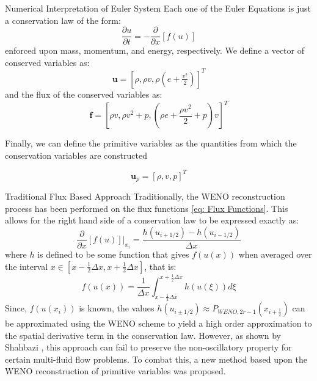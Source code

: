 \documentclass[10pt]{beamer}
\begin{document}

\begin{frame}{Numerical Interpretation of Euler System}
Each one of the Euler Equations is just a conservation law of the form:
\begin{equation}
	\frac{\partial u}{\partial t}=-\frac{\partial}{\partial x}[f(u)]\label{eq:ConservationLaw}
\end{equation}
 enforced upon mass, momentum, and energy, respectively. We define a vector of conserved variables as: $$\textbf{u}=[\rho,\rho v,\rho(e+\tfrac{v^2}{2})]^T$$ and the flux of the conserved variables as:
\begin{equation}
	\textbf{f} = [\rho v, \rho v^2 + p, (\rho e +\frac{\rho v^2}{2}+p)v]^T\label{eq: Flux Functions}
\end{equation}

Finally, we can define the primitive variables as the quantities from which the conservation variables are constructed

\begin{equation}
\textbf{u}_p=[\rho,v,p]^T
\end{equation}

\end{frame}




\begin{frame}{Traditional Flux Based Approach}
Traditionally, the WENO reconstruction process has been performed on the flux functions \eqref{eq: Flux Functions}.  This allows for the right hand side of a conservation law to be expressed exactly as:
\begin{equation}
\frac{\partial}{\partial	x}[f(u)]\bigg|_{x_i}=\frac{h(u_{i+1/2}) - h(u_{i-1/2})}{\Delta x} \label{eq: Traditional Derivative}
\end{equation}
where $h$ is defined to be some function that gives $f(u(x))$ when averaged over the interval $x\in[x-\frac{1}{2}\Delta x, x+\frac{1}{2}\Delta x]$, that is:
\begin{equation}
f(u(x))=\frac{1}{\Delta x} \int_{x-\frac{1}{2}\Delta x}^{x+\frac{1}{2}\Delta x}h(u(\xi))d\xi
\end{equation}
Since, $f(u(x_i))$ is known, the values $h(u_{i\pm1/2})\approx P_{WENO, 2r-1}(x_{i+\frac{1}{2}})$ can be approximated using the WENO scheme to yield a high order approximation to the spatial derivative term in the conservation law.  However, as shown by Shahbazi \cite{Shahbazi}, this approach can fail to preserve the non-oscillatory property for certain multi-fluid flow problems.  To combat this, a new method based upon the WENO reconstruction of primitive variables was proposed.
\end{frame}
\end{document}

